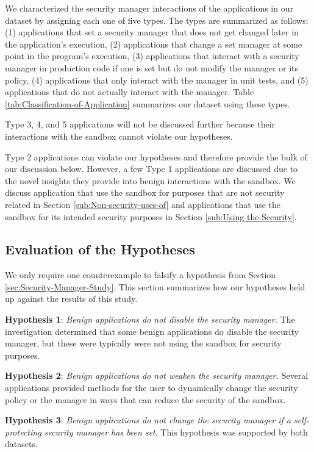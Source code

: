 \documentclass{sig-alternate}
\begin{document}
We characterized the security manager interactions of the applications in our dataset by assigning each one of five types. The
types are summarized as follows: (1) applications that set a
security manager that does not get changed later in the application's
execution, (2) applications that change a set manager at some point
in the program's execution, (3) applications that interact with a
security manager in production code if one is set but do not modify the manager or its policy, (4) applications
that only interact with the manager in unit tests, and (5) applications that do not actually interact with the manager. Table \ref{tab:Classification-of-Application}
summarizes our dataset using these types.

Type 3, 4, and 5 applications will not be discussed further because their interactions with the sandbox cannot violate our hypotheses.

Type 2 applications can violate our hypotheses and therefore provide the bulk of our discussion below. However, a few Type 1 applications are discussed due to the novel insights they provide into benign interactions with the sandbox. We discuss application that use the sandbox for purposes that are not security related in Section \ref{sub:Non-security-uses-of}
and applications that use the sandbox for its intended security purposes in Section \ref{sub:Using-the-Security}.

\subsection{Evaluation of the Hypotheses}\label{sub:Evaluation-of-the-hypotheses}

We only require one counterexample to falsify a hypothesis from Section
\ref{sec:Security-Manager-Study}. This section summarizes how our
hypotheses held up against the results of this study.

\textbf{Hypothesis 1}: \emph{Benign applications do not disable
the security manager.} The investigation determined
that some benign applications do disable the security manager, but these were typically were not using the sandbox for security purposes.

\textbf{Hypothesis 2}: \emph{Benign applications do not weaken the
security manager.} Several applications provided methods for the user to dynamically change the security policy or the manager in ways that can reduce the security of the sandbox.

\textbf{Hypothesis 3}: \emph{Benign applications do not change the
security manager if a self-protecting security manager has been set}.
This hypothesis was supported by both datasets.
\end{document}
